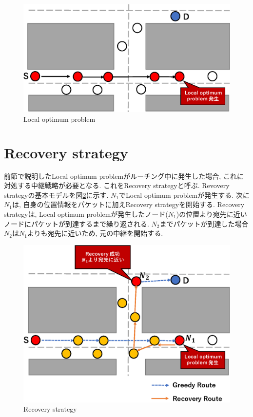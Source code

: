 \documentclass[10pt]{jreport}
\begin{document}
\begin{figure}[!ht]
	\centering
	\includegraphics[width=130mm]{figures/Local_optimum_problem.eps}
	\caption{Local optimum problem}
	\label{fig:Local_optimum}
\end{figure}

\section{Recovery strategy}
前節で説明したLocal optimum problemがルーチング中に発生した場合, これに対処する中継戦略が必要となる. これをRecovery strategy\cite{28}と呼ぶ. Revovery strategyの基本モデルを図\ref{fig:Recovery}に示す. $N_{1}$でLocal optimum problemが発生する. 次に$N_{1}$は, 自身の位置情報をパケットに加えRecovery strategyを開始する. Recovery strategyは, Local optimum problemが発生したノード($N_{1}$)の位置より宛先に近いノードにパケットが到達するまで繰り返される. $N_{2}$までパケットが到達した場合$N_{2}$は$N_{1}$よりも宛先に近いため, 元の中継を開始する. 
  

\begin{figure}[!ht]
	\centering
	\includegraphics[width=130mm]{figures/basic-recovery.eps}
	\caption{Recovery strategy}
	\label{fig:Recovery}
\end{figure}
\end{document}

